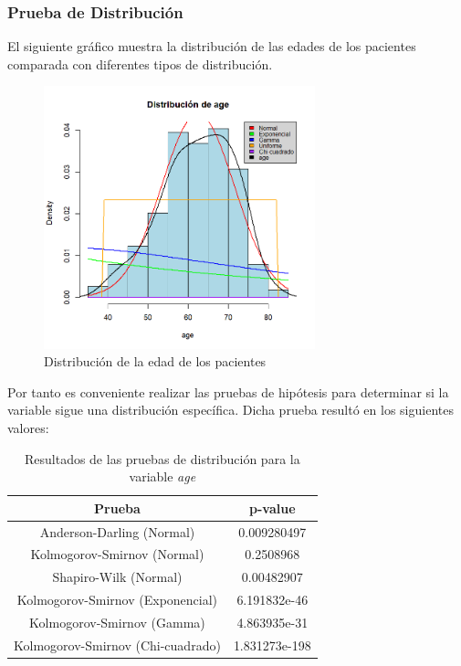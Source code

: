 \documentclass[a4paper,12pt]{article}
\begin{document}
    \subsubsection*{Prueba de Distribución}

    El siguiente gráfico muestra la distribución de las edades de los pacientes comparada con diferentes tipos de distribución.

 \begin{figure}[h]
 	\centering
 	\includegraphics[width=0.7\textwidth]{distribucion_age.png}
 	\caption{Distribución de la edad de los pacientes}
 	\label{fig:age_distribution}
 \end{figure}

Por tanto es conveniente realizar las pruebas de hipótesis para determinar si la variable
sigue una distribución específica. Dicha prueba resultó en los siguientes valores:

\newpage 

\begin{table}[h!]
    \centering
    \begin{tabular}{|c|c|}
        \hline
        \textbf{Prueba} & \textbf{p-value} \\
        \hline
        Anderson-Darling (Normal) & 0.009280497 \\
        \hline
        Kolmogorov-Smirnov (Normal) & 0.2508968 \\
        \hline
        Shapiro-Wilk (Normal) & 0.00482907 \\
        \hline
        Kolmogorov-Smirnov (Exponencial) & 6.191832e-46 \\
        \hline
        Kolmogorov-Smirnov (Gamma) & 4.863935e-31 \\
        \hline
        Kolmogorov-Smirnov (Chi-cuadrado) & 1.831273e-198 \\
        \hline
    \end{tabular}
    \caption{Resultados de las pruebas de distribución para la variable \textit{age}}
    \label{tab:pruebas_distribucion_age}
\end{table}
\end{document}
